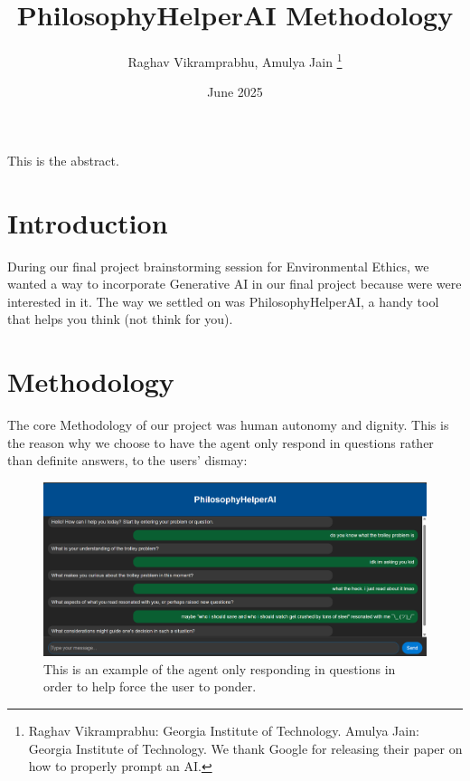 \documentclass[letterpaper,11pt,leqno]{article}
\begin{document}
\title{PhilosophyHelperAI Methodology}

\author{Raghav Vikramprabhu, Amulya Jain
%
\thanks{Raghav Vikramprabhu: Georgia Institute of Technology. Amulya Jain: Georgia Institute of Technology. We thank Google for releasing their paper on how to properly prompt an AI.}}

\date{June 2025}   


\begin{titlepage}
\maketitle

This is the abstract. 

\end{titlepage}


\section{Introduction}\label{s:introduction}
 
During our final project brainstorming session for Environmental Ethics, we wanted a way to incorporate Generative AI in our final project because were were interested in it. The way we settled on was PhilosophyHelperAI, a handy tool that helps you think (not think for you). \cite{GoogleAIDev}


\section{Methodology}\label{s:section}

The core Methodology of our project was human autonomy and dignity.
This is the reason why we choose to have the agent only respond in questions rather than definite answers, to the users' dismay:

\begin{figure}[h!]
  \centering
  \includegraphics[width=\textwidth]{docs/images/userresponse1.png}
  \caption{This is an example of the agent only responding in questions in order to help force the user to ponder.}
  \label{fig:sample}
\end{figure}
\end{document}
